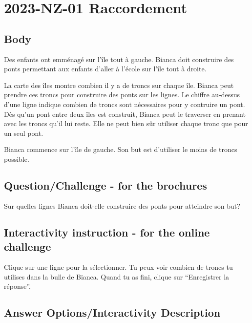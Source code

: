 \documentclass[a4paper,11pt]{report}
\newcommand{\taskGraphicsFolder}{..}
\begin{document}
\section*{\centering{} 2023-NZ-01 Raccordement}


\subsection*{Body}

Des enfants ont emménagé sur l’île tout à gauche. Bianca doit construire des ponts permettant aux enfants d’aller à l’école sur l’île tout à droite.

La carte des îles montre combien il y a de troncs sur chaque île. Bianca peut prendre ces troncs pour construire des ponts sur les lignes. Le chiffre au-dessus d’une ligne indique combien de troncs sont nécessaires pour y contruire un pont. Dès qu’un pont entre deux îles est construit, Bianca peut le traverser en prenant avec les troncs qu’il lui reste. Elle ne peut bien sûr utiliser chaque tronc que pour un seul pont.

Bianca commence sur l’île de gauche. Son but est d’utiliser le moins de troncs possible.

{\em


\subsection*{Question/Challenge - for the brochures}

Sur quelles lignes Bianca doit-elle construire des ponts pour atteindre son but?

{\centering%
\par}

}


\subsection*{Interactivity instruction - for the online challenge}

Clique sur une ligne pour la sélectionner. Tu peux voir combien de troncs tu utilises dans la bulle de Bianca. Quand tu as fini, clique sur “Enregistrer la réponse”.

\begingroup
\renewcommand{\arraystretch}{1.5}
\subsection*{Answer Options/Interactivity Description}
\end{document}
